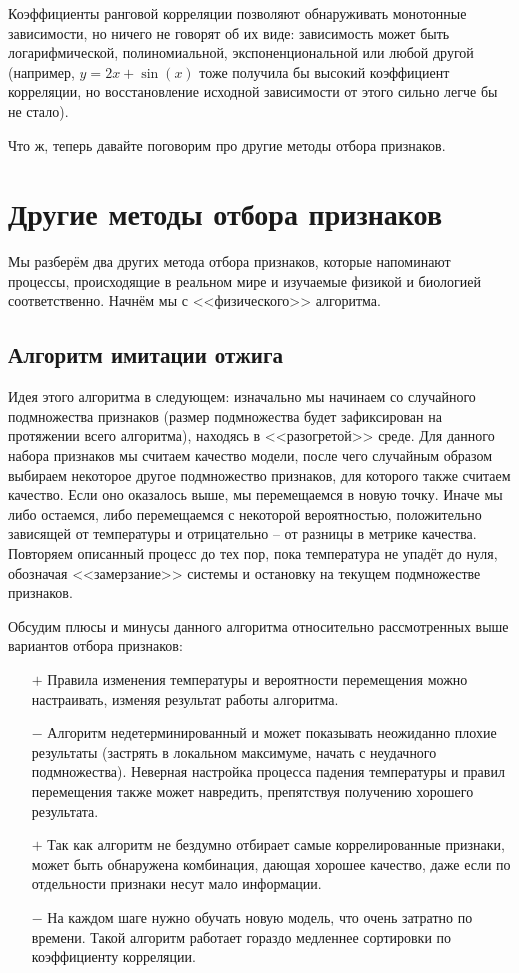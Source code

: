 \documentclass[12pt,fleqn]{article}
\begin{document}
\begin{itemize}
		Коэффициенты ранговой корреляции позволяют обнаруживать монотонные зависимости, но ничего не говорят об их виде: зависимость может быть логарифмической, полиномиальной, экспоненциональной или любой другой (например, $ y = 2x + \sin(x) $ тоже получила бы высокий коэффициент корреляции, но восстановление исходной зависимости от этого сильно легче бы не стало).
	\end{itemize}

	Что ж, теперь давайте поговорим про другие методы отбора признаков.

	\section{Другие методы отбора признаков}

	Мы разберём два других метода отбора признаков, которые напоминают процессы, происходящие в реальном мире и изучаемые физикой и биологией соответственно. Начнём мы с <<физического>> алгоритма.

	\subsection{Алгоритм имитации отжига}

	Идея этого алгоритма в следующем: изначально мы начинаем со случайного подмножества признаков (размер подмножества будет зафиксирован на протяжении всего алгоритма), находясь в <<разогретой>> среде. Для данного набора признаков мы считаем качество модели, после чего случайным образом выбираем некоторое другое подмножество признаков, для которого также считаем качество. Если оно оказалось выше, мы перемещаемся в новую точку. Иначе мы либо остаемся, либо перемещаемся с некоторой вероятностью, положительно зависящей от температуры и отрицательно -- от разницы в метрике качества. Повторяем описанный процесс до тех пор, пока температура не упадёт до нуля, обозначая <<замерзание>> системы и остановку на текущем подмножестве признаков.

	Обсудим плюсы и минусы данного алгоритма относительно рассмотренных выше вариантов отбора признаков:
	\begin{itemize}
		\item[$ + $] Правила изменения температуры и вероятности перемещения можно настраивать, изменяя результат работы алгоритма.
		\item[$ - $] Алгоритм недетерминированный и может показывать неожиданно плохие результаты (застрять в локальном максимуме, начать с неудачного подмножества). Неверная настройка процесса падения температуры и правил перемещения также может навредить, препятствуя получению хорошего результата.
		\item[$ + $] Так как алгоритм не бездумно отбирает самые коррелированные признаки, может быть обнаружена комбинация, дающая хорошее качество, даже если по отдельности признаки несут мало информации.
		\item[$ - $] На каждом шаге нужно обучать новую модель, что очень затратно по времени. Такой алгоритм работает гораздо медленнее сортировки по коэффициенту корреляции.
	\end{itemize}
\end{document}
